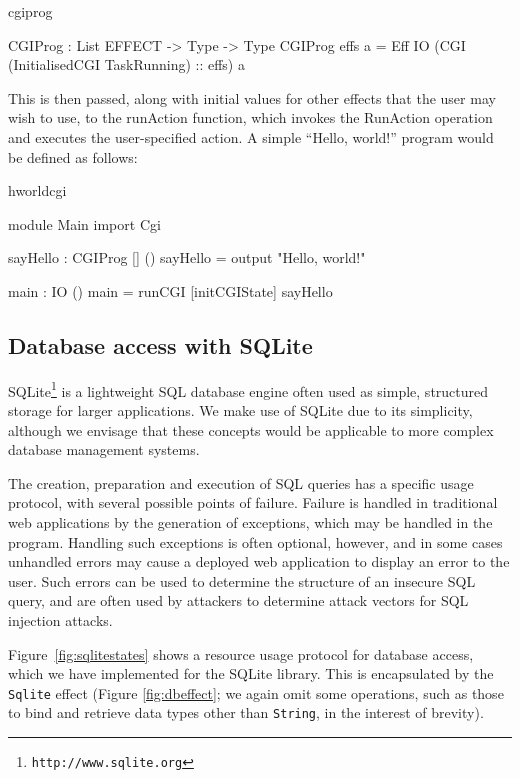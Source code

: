 \begin{SaveVerbatim}{cgiprog}

CGIProg : List EFFECT -> Type -> Type
CGIProg effs a = 
  Eff IO (CGI (InitialisedCGI TaskRunning) :: effs) a

\end{SaveVerbatim}

\noindent
This is then passed, along with initial values for other effects that the user
may wish to use, to the runAction function, which invokes the RunAction
operation and executes the user-specified action.
%
A simple ``Hello, world!'' program would be defined as follows:

\begin{SaveVerbatim}{hworldcgi}

module Main
import Cgi

sayHello : CGIProg [] ()
sayHello = output "Hello, world!"

main : IO ()
main = runCGI [initCGIState] sayHello

\end{SaveVerbatim}

\subsection{Database access with SQLite}

SQLite\footnote{\texttt{http://www.sqlite.org}} is a lightweight SQL database
engine often used as simple, structured storage for larger applications. We
make use of SQLite due to its simplicity, although we envisage that these
concepts would be applicable to more complex database management systems. 

The creation, preparation and execution of SQL queries has a specific usage
protocol, with several possible points of failure. Failure is handled in
traditional web applications by the generation of exceptions, which may be
handled in the program.  Handling such exceptions is often optional, however,
and in some cases unhandled errors may cause a deployed web application to
display an error to the user. Such errors can be used to determine the
structure of an insecure SQL query, and are often used by attackers to
determine attack vectors for SQL injection attacks.

Figure~\ref{fig:sqlitestates} shows a resource usage protocol for database
access, which we have implemented for the SQLite library. This is encapsulated
by the \texttt{Sqlite} effect (Figure \ref{fig:dbeffect}; we again omit some operations, such as those to
bind and retrieve data types other than \texttt{String}, in the interest of
brevity).

